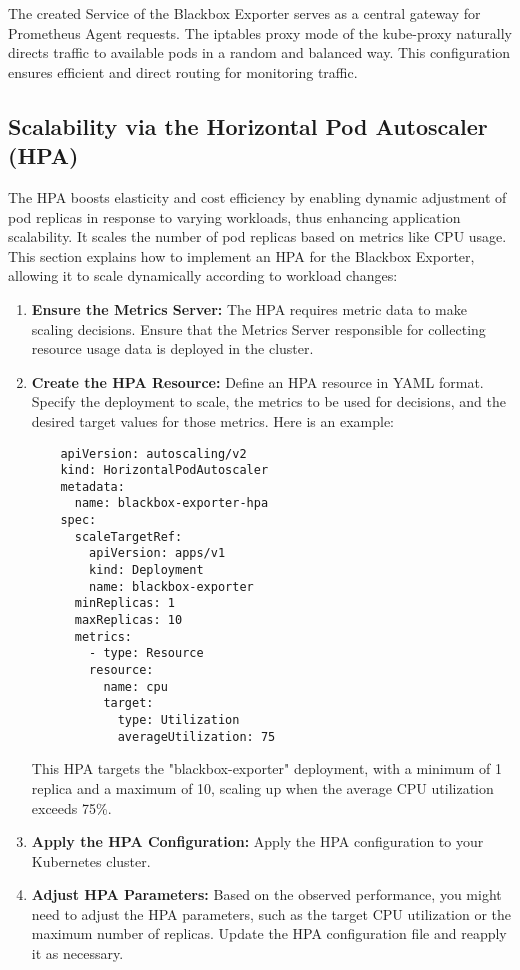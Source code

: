 The created Service of the Blackbox Exporter serves as a central gateway for Prometheus Agent requests. The iptables proxy mode of the kube-proxy naturally directs traffic to available pods in a random and balanced way. This configuration ensures efficient and direct routing for monitoring traffic. 

\subsection{Scalability via the Horizontal Pod Autoscaler (\ac{HPA})}

The \ac{HPA} boosts elasticity and cost efficiency by enabling dynamic adjustment of pod replicas in response to varying workloads, thus enhancing application scalability. It scales the number of pod replicas based on metrics like CPU usage. This section explains how to implement an \ac{HPA} for the Blackbox Exporter, allowing it to scale dynamically according to workload changes: 

\begin{enumerate}
    \item \textbf{Ensure the Metrics Server:}
    The \ac{HPA} requires metric data to make scaling decisions. Ensure that the Metrics Server responsible for collecting resource usage data is deployed in the cluster. 
    \item \textbf{Create the \ac{HPA} Resource:}
    Define an \ac{HPA} resource in YAML format. Specify the deployment to scale, the metrics to be used for decisions, and the desired target values for those metrics. Here is an example:
    \begin{verbatim}
    apiVersion: autoscaling/v2
    kind: HorizontalPodAutoscaler
    metadata:
      name: blackbox-exporter-hpa
    spec:
      scaleTargetRef:
        apiVersion: apps/v1
        kind: Deployment
        name: blackbox-exporter
      minReplicas: 1
      maxReplicas: 10
      metrics:
        - type: Resource
        resource:
          name: cpu
          target:
            type: Utilization
            averageUtilization: 75
    \end{verbatim}
    This \ac{HPA} targets the "blackbox-exporter" deployment, with a minimum of 1 replica and a maximum of 10, scaling up when the average CPU utilization exceeds 75\%.
    \item \textbf{Apply the \ac{HPA} Configuration:}
    Apply the \ac{HPA} configuration to your Kubernetes cluster. 
    \item \textbf{Adjust \ac{HPA} Parameters:}
    Based on the observed performance, you might need to adjust the \ac{HPA} parameters, such as the target \ac{CPU} utilization or the maximum number of replicas. Update the \ac{HPA} configuration file and reapply it as necessary.
\end{enumerate}

